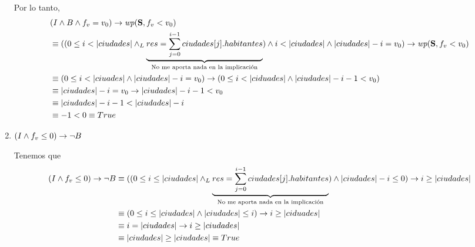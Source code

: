 \documentclass[10pt,a4paper]{article}
\begin{document}
\begin{enumerate}
	      Por lo tanto,
	      \begin{align*}
		       & (I \land B \land f_v = v_0) \Then \wp{S}{f_v < v_0}                                                                                                                                                                          \\
		       & \equiv ((0 \leq i < |ciudades| \yLuego \underbrace{res = \sum_{j = 0}^{i - 1} ciudades[j].habitantes}_{\text{No me aporta nada en la implicación}}) \land i < |ciudades| \land |ciudades| - i = v_0) \Then \wp{S}{f_v < v_0} \\
		       & \equiv (0 \leq i < |ciuades| \land |ciudades| - i = v_0) \Then (0 \leq i < |ciduades| \land |ciudades| - i - 1 < v_0)                                                                                                        \\
		       & \equiv |ciudades| - i = v_0 \Then |ciudades| - i - 1 < v_0                                                                                                                                                                   \\
		       & \equiv |ciudades| - i - 1 < |ciudades| - i                                                                                                                                                                                   \\
		       & \equiv -1 < 0 \equiv True
	      \end{align*}

	\item $(I \land f_v \leq 0) \rightarrow \neg B$

	      Tenemos que
	      \begin{align*}
		      (I \land f_v \leq 0) \rightarrow \neg B & \equiv ((0 \leq i \leq |ciudades| \land _L \underbrace{res = \sum_{j = 0}^{i - 1} ciudades[j].habitantes}_{\text{No me aporta nada en la implicación}}) \land |ciudades| - i \leq 0) \rightarrow i \geq |ciudades| \\
		                                        & \equiv (0 \leq i \leq |ciudades| \land |ciudades| \leq i) \rightarrow i \geq |ciduades|                                                                                                                           \\
		                                        & \equiv i = |ciudades| \rightarrow i \geq |ciudades|                                                                                                                                                               \\
		                                        & \equiv |ciudades| \geq |ciudades| \equiv True
	      \end{align*}
\end{enumerate}
\end{document}
